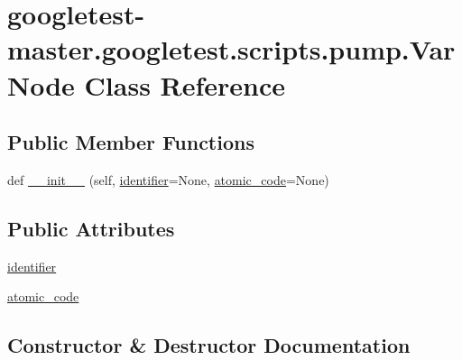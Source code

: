 \hypertarget{classgoogletest-master_1_1googletest_1_1scripts_1_1pump_1_1_var_node}{}\section{googletest-\/master.googletest.\+scripts.\+pump.\+Var\+Node Class Reference}
\label{classgoogletest-master_1_1googletest_1_1scripts_1_1pump_1_1_var_node}
\subsection*{Public Member Functions}
\begin{DoxyCompactItemize}
\item 
def \mbox{\hyperlink{classgoogletest-master_1_1googletest_1_1scripts_1_1pump_1_1_var_node_a4abd02be30f8fddc6e110bc8dd6e4e32}{\+\_\+\+\_\+init\+\_\+\+\_\+}} (self, \mbox{\hyperlink{classgoogletest-master_1_1googletest_1_1scripts_1_1pump_1_1_var_node_ac88b07d63640932c7bb5121d97f4cced}{identifier}}=None, \mbox{\hyperlink{classgoogletest-master_1_1googletest_1_1scripts_1_1pump_1_1_var_node_ae7464059246a712124b1b94f722ff38f}{atomic\+\_\+code}}=None)
\end{DoxyCompactItemize}
\subsection*{Public Attributes}
\begin{DoxyCompactItemize}
\item 
\mbox{\hyperlink{classgoogletest-master_1_1googletest_1_1scripts_1_1pump_1_1_var_node_ac88b07d63640932c7bb5121d97f4cced}{identifier}}
\item 
\mbox{\hyperlink{classgoogletest-master_1_1googletest_1_1scripts_1_1pump_1_1_var_node_ae7464059246a712124b1b94f722ff38f}{atomic\+\_\+code}}
\end{DoxyCompactItemize}


\subsection{Constructor \& Destructor Documentation}
\mbox{\label{classgoogletest-master_1_1googletest_1_1scripts_1_1pump_1_1_var_node_a4abd02be30f8fddc6e110bc8dd6e4e32}} 
